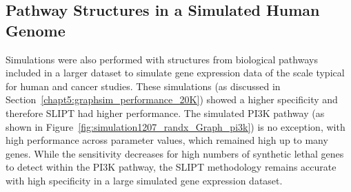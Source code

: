 \FloatBarrier

\subsection{Pathway Structures in a Simulated Human Genome}
\label{chapt5:graphsim_performance_20K_pway}
\FloatBarrier

Simulations were also performed with  structures from biological pathways included in a larger dataset to simulate \gls{gene expression} data of the scale typical for human and cancer studies. These simulations (as discussed in Section~\ref{chapt5:graphsim_performance_20K}) showed a higher specificity and therefore \gls{SLIPT} had higher performance. The simulated \gls{PI3K} pathway (as shown in Figure~\ref{fig:simulation1207_randx_Graph_pi3k}) is no exception, with high performance across parameter values, which remained high up to many genes. While the sensitivity decreases for high numbers of \gls{synthetic lethal} genes to detect within the \gls{PI3K} pathway, the \gls{SLIPT} methodology remains accurate with high specificity in a large simulated \gls{gene expression} dataset. 

